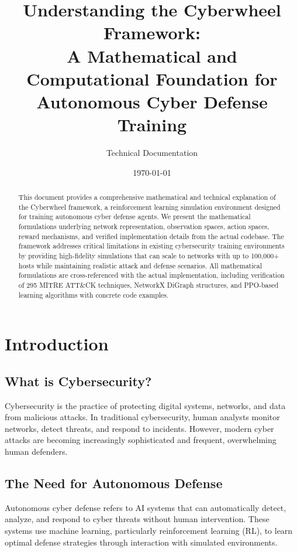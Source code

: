\documentclass[12pt,a4paper]{article}
\title{\textbf{Understanding the Cyberwheel Framework: \\
A Mathematical and Computational Foundation for \\
Autonomous Cyber Defense Training}}
\author{Technical Documentation}
\date{\today}
\begin{document}
\maketitle

\begin{abstract}
This document provides a comprehensive mathematical and technical explanation of the Cyberwheel framework, a reinforcement learning simulation environment designed for training autonomous cyber defense agents. We present the mathematical formulations underlying network representation, observation spaces, action spaces, reward mechanisms, and verified implementation details from the actual codebase. The framework addresses critical limitations in existing cybersecurity training environments by providing high-fidelity simulations that can scale to networks with up to 100,000+ hosts while maintaining realistic attack and defense scenarios. All mathematical formulations are cross-referenced with the actual implementation, including verification of 295 MITRE ATT\&CK techniques, NetworkX DiGraph structures, and PPO-based learning algorithms with concrete code examples.
\end{abstract}

\tableofcontents
\newpage

\section{Introduction}

\subsection{What is Cybersecurity?}
Cybersecurity is the practice of protecting digital systems, networks, and data from malicious attacks. In traditional cybersecurity, human analysts monitor networks, detect threats, and respond to incidents. However, modern cyber attacks are becoming increasingly sophisticated and frequent, overwhelming human defenders.

\subsection{The Need for Autonomous Defense}
Autonomous cyber defense refers to AI systems that can automatically detect, analyze, and respond to cyber threats without human intervention. These systems use machine learning, particularly reinforcement learning (RL), to learn optimal defense strategies through interaction with simulated environments.
\end{document}
